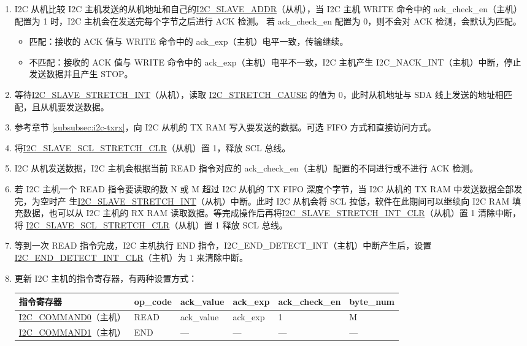 \documentclass[main\_\_CN.tex]{subfiles}
\begin{document}
\begin{enumerate}
\item I2C 从机比较 I2C 主机发送的从机地址和自己的\hyperref[fielddesc:I2CSLAVEADDR]{I2C\_SLAVE\_ADDR}（从机），当 I2C 主机 WRITE 命令中的 ack\_check\_en（主机）配置为 1 时，I2C 主机会在发送完每个字节之后进行 ACK 检测。 若 ack\_check\_en 配置为 0，则不会对 ACK 检测，会默认为匹配。
\begin{itemize}
\item 匹配：接收的 ACK 值与 WRITE 命令中的 ack\_exp（主机）电平一致，传输继续。
\item 不匹配：接收的 ACK 值与 WRITE 命令中的 ack\_exp（主机）电平不一致，I2C 主机产生 I2C\_NACK\_INT（主机）中断，停止发送数据并且产生 STOP。
\end{itemize}

\item 等待\hyperref[int:i2c-slave-stretch]{I2C\_SLAVE\_STRETCH\_INT}（从机），读取 \hyperref[fielddesc:I2CSTRETCHCAUSE]{I2C\_STRETCH\_CAUSE} 的值为 0，此时从机地址与 SDA 线上发送的地址相匹配，且从机要发送数据。

\item 参考章节 \ref{subsubsec:i2c-txrx}，向 I2C 从机的 TX RAM 写入要发送的数据。可选 FIFO 方式和直接访问方式。
\item 将\hyperref[fielddesc:I2CSLAVESCLSTRETCHCLR]{I2C\_SLAVE\_SCL\_STRETCH\_CLR}（从机）置 1，释放 SCL 总线。

\item I2C 从机发送数据，I2C 主机会根据当前 READ 指令对应的 ack\_check\_en（主机）配置的不同进行或不进行 ACK 检测。
\item 若 I2C 主机一个 READ 指令要读取的数 N 或 M 超过 I2C 从机的 TX FIFO 深度个字节，当 I2C 从机的 TX RAM 中发送数据全部发完，为空时产 生\hyperref[int:i2c-slave-stretch]{I2C\_SLAVE\_STRETCH\_INT}（从机）中断。此时 I2C 从机会将 SCL 拉低，软件在此期间可以继续向 I2C RAM 填充数据，也可以从 I2C 主机的 RX RAM 读取数据。等完成操作后再将\hyperref[fielddesc:I2CSLAVESTRETCHINTCLR]{I2C\_SLAVE\_STRETCH\_INT\_CLR}（从机）置 1 清除中断，将 \hyperref[fielddesc:I2CSLAVESCLSTRETCHCLR]{I2C\_SLAVE\_SCL\_STRETCH\_CLR}（从机）置 1 释放 SCL 总线。
\item 等到一次 READ 指令完成，I2C 主机执行 END 指令，I2C\_END\_DETECT\_INT（主机）中断产生后，设置 \hyperref[fielddesc:I2CENDDETECTINTCLR]{I2C\_END\_DETECT\_INT\_CLR}（主机）为 1 来清除中断。

\newpage
\item 更新 I2C 主机的指令寄存器，有两种设置方式：

\begin{longtable}{ | p{4cm} | p{2cm} | p{2cm} | p{2cm} |p{2cm} | p{2cm} |}
\hline\rowcolor{lightgray}
指令寄存器& op\_code & ack\_value&ack\_exp&ack\_check\_en&byte\_num  \\ \hline
\hyperref[fielddesc:I2CCOMMAND0]{I2C\_COMMAND0}（主机）& READ& ack\_value&ack\_exp&1&M  \\ \hline
\hyperref[fielddesc:I2CCOMMAND1]{I2C\_COMMAND1}（主机）& END& ---&---&---&---  \\ \hline
\end{longtable}


\end{enumerate}
\end{document}
